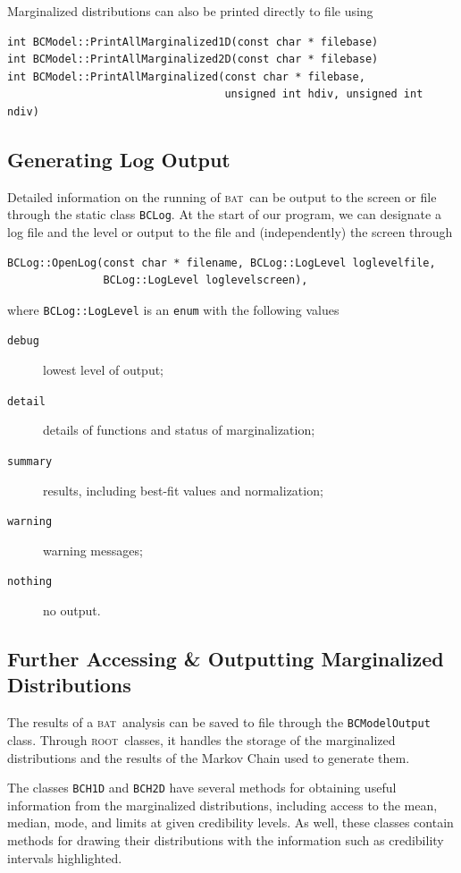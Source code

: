 \documentclass[a4paper,11pt]{article}
\newcommand{\acronym}[1]{\textsc{#1}}
\newcommand{\BAT}{\acronym{bat}}
\newcommand{\ROOT}{\acronym{root}}
\newcommand{\Icode}[1]{\texttt{#1}}
\begin{document}
Marginalized distributions can also be printed directly to file using
\begin{verbatim}
int BCModel::PrintAllMarginalized1D(const char * filebase)
int BCModel::PrintAllMarginalized2D(const char * filebase)
int BCModel::PrintAllMarginalized(const char * filebase,
                                  unsigned int hdiv, unsigned int ndiv)
\end{verbatim}

\subsection{Generating Log Output}

Detailed information on the running of \BAT\ can be output to the
screen or file through the static class \Icode{BCLog}. At the start of
our program, we can designate a log file and the level or output to
the file and (independently) the screen through
\begin{verbatim}
BCLog::OpenLog(const char * filename, BCLog::LogLevel loglevelfile,
               BCLog::LogLevel loglevelscreen),
\end{verbatim}
where \Icode{BCLog::LogLevel} is an \Icode{enum} with the following values
\begin{description}
\item[\quad\Icode{debug}] lowest level of output;
\item[\quad\Icode{detail}] details of functions and status of marginalization;
\item[\quad\Icode{summary}] results, including best-fit values and normalization;
\item[\quad\Icode{warning}] warning messages;
\item[\quad\Icode{nothing}] no output.
\end{description}

\subsection{Further Accessing \& Outputting Marginalized
  Distributions}

The results of a \BAT\ analysis can be saved to file through the
\Icode{BCModelOutput} class. Through \ROOT\ classes, it handles the
storage of the marginalized distributions and the results of the
Markov Chain used to generate them.

The classes \Icode{BCH1D} and \Icode{BCH2D} have several methods for
obtaining useful information from the marginalized distributions,
including access to the mean, median, mode, and limits at given
credibility levels. As well, these classes contain methods for drawing
their distributions with the information such as credibility intervals
highlighted.
\end{document}
